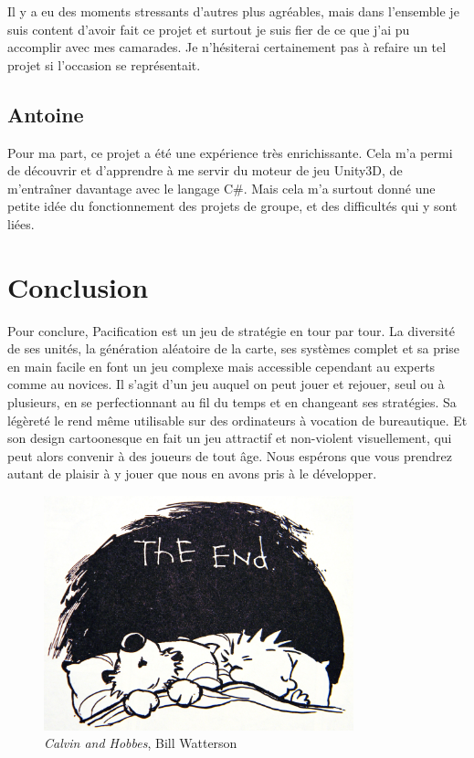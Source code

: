 \documentclass[12pt]{report}
\begin{document}
Il y a eu des moments stressants d’autres plus agréables, mais dans l’ensemble
je suis content d’avoir fait ce projet et surtout je suis fier de ce que j’ai pu
accomplir avec mes camarades. Je n’hésiterai certainement pas à refaire un tel
projet si l’occasion se représentait. 

\section{Antoine}

Pour ma part, ce projet a été une expérience très enrichissante. Cela m’a permi
de découvrir et d’apprendre à me servir du moteur de jeu Unity3D, de m'entraîner
davantage avec le langage C\#. Mais cela m’a surtout donné une petite idée du
fonctionnement des projets de groupe, et des difficultés qui y sont liées.

\chapter{Conclusion}

Pour conclure, Pacification est un jeu de stratégie en tour par tour. La
diversité de ses unités, la génération aléatoire de la carte, ses systèmes
complet et sa prise en main facile en font un jeu complexe mais accessible
cependant au experts comme au novices. Il s’agit d’un jeu auquel on peut jouer
et rejouer, seul ou à plusieurs, en se perfectionnant au fil du temps et en
changeant ses stratégies. Sa légèreté le rend même utilisable sur des
ordinateurs à vocation de bureautique. Et son design cartoonesque en fait un jeu
attractif et non-violent visuellement, qui peut alors convenir à des joueurs de
tout âge.  Nous espérons que vous prendrez autant de plaisir à y jouer que nous
en avons pris à le développer.

\begin{figure}
    \centering
    \includegraphics[width=0.8\textwidth]{project_mood}
    \caption*{\textit{Calvin and Hobbes}, Bill Watterson}
\end{figure}
\end{document}
